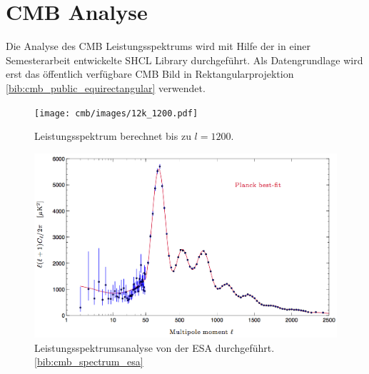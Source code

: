 \section{CMB Analyse}

Die Analyse des CMB Leistungsspektrums wird mit Hilfe der in einer 
Semesterarbeit entwickelte SHCL Library durchgeführt. Als Datengrundlage wird 
erst das öffentlich verfügbare CMB Bild in Rektangularprojektion 
\ref{bib:cmb_public_equirectangular} verwendet.

\begin{figure}
	\centering
	\texttt{[image: cmb/images/12k\_1200.pdf]}
	\caption{Leistungsspektrum berechnet bis zu $l = 1200$.}
	\label{fig:cmb-power-spec-1200}
\end{figure}

\begin{figure}
	\centering
	\includegraphics[width=\linewidth]{cmb/images/mission_spectrum.png}
	\caption{Leistungsspektrumsanalyse von der ESA durchgeführt. 
	\ref{bib:cmb_spectrum_esa}}
	\label{fig:cmb-power-spec-1200}
\end{figure}
